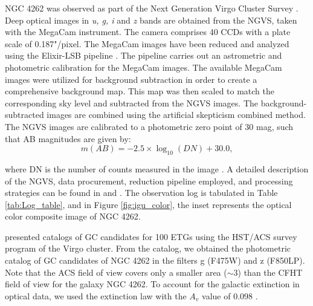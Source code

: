 \documentclass[fleqn,usenatbib]{mnras}
\begin{document}
\begin{table}
\caption{Log of CFHT observations.}
\label{tab:Log_table}
\end{table}
NGC 4262 was observed as part of the Next Generation Virgo Cluster Survey \citep[NGVS]{Ferrarese2012}. Deep optical images in {\it u, g, i} and {\it z } bands are obtained from the NGVS, taken with the MegaCam instrument. The camera comprises 40 CCDs with a plate scale of 0.187"/pixel. The MegaCam images have been reduced and analyzed using the Elixir-LSB pipeline \citep{Ferrarese2012}. The pipeline carries out an astrometric and photometric calibration for the MegaCam images. The available MegaCam images were utilized for background subtraction in order to create a comprehensive background map. This map was then scaled to match the corresponding sky level and subtracted from the NGVS images. The background-subtracted images are combined using the artificial skepticism combined method. The NGVS images are calibrated to a photometric zero point of 30 mag, such that AB magnitudes are given by:
\begin{equation}
    m(AB) = -2.5 \times \log_{10}(DN) + 30.0,
\end{equation}

where DN is the number of counts measured in the image \citep{Ferrarese2012}. A detailed description of the NGVS, data procurement, reduction pipeline employed, and processing strategies can be found in \citet{Ferrarese2012,durell_ngvs2014} and \citet{cantiello_ngvs2018}. The observation log is tabulated in Table \ref{tab:Log_table}, and in Figure \ref{fig:igu_color}, the inset represents the optical color composite image of NGC 4262. \par


\citet{2009Jordan} presented catalogs of GC candidates for 100 ETGs using the HST/ACS survey program of the Virgo cluster. From the catalog, we obtained the photometric catalog of GC candidates of NGC 4262 in the filters g (F475W) and z (F850LP). Note that the ACS field of view covers only a smaller area ($\sim $3\arcmin) than the CFHT field of view for the galaxy NGC 4262. To account for the galactic extinction in optical data, we used the \citet{1989Cardelli} extinction law with the  $A_v$ value of 0.098 \citep{2011Schalfyfinkbeinr}. 
\end{document}
